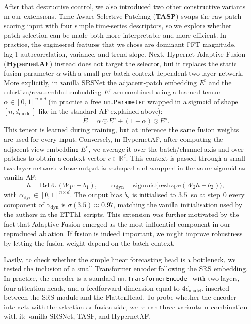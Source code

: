 \documentclass[10pt]{article}
\begin{document}
After that destructive control, we also introduced two other constructive variants
in our extensions. Time-Aware Selective Patching (\textbf{TASP}) swaps the raw patch scoring
input with four simple time-series descriptors, so we explore whether patch selection can be made both more
interpretable and more efficient. In practice, the engineered features that we chose are dominant FFT magnitude,
lag-1 autocorrelation, variance, and trend slope. Next, Hypernet Adaptive Fusion (\textbf{HypernetAF}) instead does not target
the selector, but it replaces the static fusion parameter $\alpha$ with a small per-batch context-dependent two-layer network.
More explicitly, in vanilla SRSNet the adjacent-patch embedding $E^c$ and the selective/reassembled embedding $E^s$ are combined
using a learned tensor $\alpha \in [0,1]^{n \times d}$ (in practice a free \texttt{nn.Parameter} wrapped in a sigmoid of shape $[n, d_\text{model}]$ like in the standard AF explained above):
  \[
  \tilde{E} = \alpha \odot E^c + (1 - \alpha) \odot E^s.
  \]
This tensor is learned during training, but at inference the same fusion weights are used
for every input.
Conversely, in HypernetAF, after computing the
adjacent-view embedding $E^c$, we average it over the batch/channel axis and over patches
to obtain a context vector $c \in \mathbb{R}^d$. This context is passed through a small
two-layer network whose output is reshaped and wrapped in the same sigmoid as vanilla AF:
  \[
  h = \mathrm{ReLU}(W_1 c + b_1), \qquad
  \alpha_{\mathrm{dyn}} = \mathrm{sigmoid}\!\bigl(\mathrm{reshape}(W_2 h + b_2)\bigr),
  \]
with $\alpha_{\mathrm{dyn}} \in [0,1]^{n \times d}$. The output bias $b_2$ is initialised to
$3.5$, so at step~$0$ every component of $\alpha_{\mathrm{dyn}}$ is $\sigma(3.5) \approx 0.97$,
matching the vanilla initialisation used by the authors in the ETTh1 scripts. This extension was further motivated by
the fact that Adaptive Fusion emerged as the most influential component in our reproduced ablation.
If fusion is indeed important, we might improve robustness by letting the fusion weight depend on the
batch context.

Lastly, to check whether the simple linear forecasting head is a bottleneck, we tested the inclusion
of a small Transformer encoder following the SRS embedding. In practice, the encoder is a
standard \texttt{nn.TransformerEncoder} with two layers, four attention heads, and a feedforward
dimension equal to $4 d_{\mathrm{model}}$, inserted between the SRS module and the FlattenHead.
To probe whether the encoder interacts with the selection or fusion side, we re-ran three variants
in combination with it: vanilla SRSNet, TASP, and HypernetAF.
\end{document}
